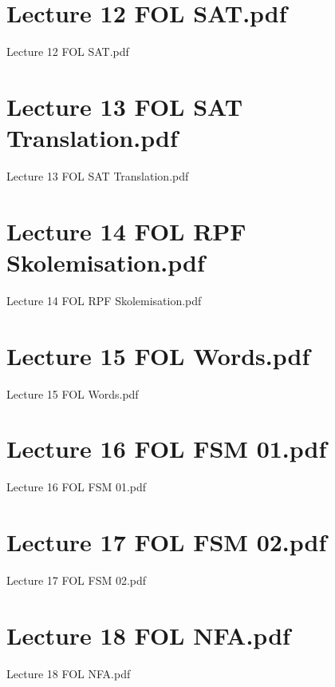 \documentclass[aspectratio = 43]{beamer}
\begin{document}
\section{Lecture 12 FOL SAT.pdf}
\begin{frame}{Lecture 12 FOL SAT.pdf}
\end{frame}

\section{Lecture 13 FOL SAT Translation.pdf}
\begin{frame}{Lecture 13 FOL SAT Translation.pdf}
\end{frame}

\section{Lecture 14 FOL RPF Skolemisation.pdf}
\begin{frame}{Lecture 14 FOL RPF Skolemisation.pdf}
\end{frame}

\section{Lecture 15 FOL Words.pdf}
\begin{frame}{Lecture 15 FOL Words.pdf}
\end{frame}

\section{Lecture 16 FOL FSM 01.pdf}
\begin{frame}{Lecture 16 FOL FSM 01.pdf}
\end{frame}

\section{Lecture 17 FOL FSM 02.pdf}
\begin{frame}{Lecture 17 FOL FSM 02.pdf}
\end{frame}

\section{Lecture 18 FOL NFA.pdf}
\begin{frame}{Lecture 18 FOL NFA.pdf}
\end{frame}

\end{document}
